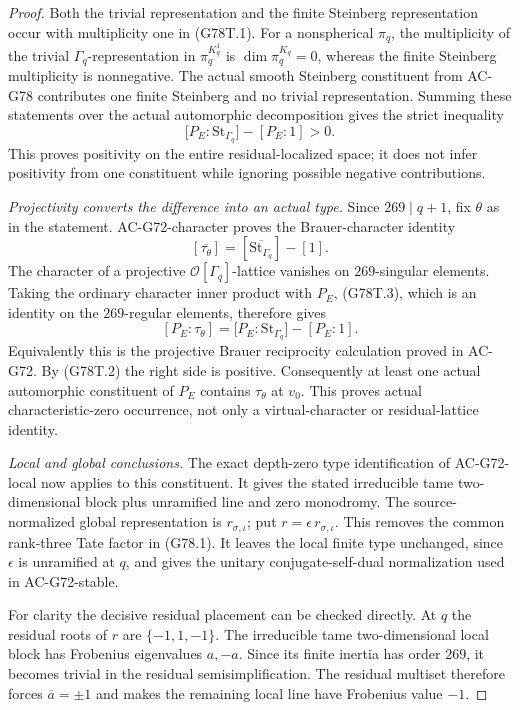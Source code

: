 \begin{proof}
Both the trivial representation and the finite Steinberg
representation occur with multiplicity one in (G78T.1).
For a nonspherical \(\pi_q\), the multiplicity of the trivial
\(\Gamma_q\)-representation in \(\pi_q^{K_q^1}\) is
\(\dim\pi_q^{K_q}=0\), whereas the finite Steinberg multiplicity
is nonnegative.
The actual smooth Steinberg constituent from AC-G78 contributes
one finite Steinberg and no trivial representation.
Summing these statements over the actual automorphic
decomposition gives the strict inequality
\[
 \bigl[P_E:\mathrm{St}_{\Gamma_q}\bigr]
                    -[P_E:1] >0.                   \tag{G78T.2}
\]
This proves positivity on the entire residual-localized space;
it does not infer positivity from one constituent while ignoring
possible negative contributions.

\emph{Projectivity converts the difference into an actual type.}
Since \(269\mid q+1\), fix \(\theta\) as in the statement.
AC-G72-character proves the Brauer-character identity
\[
             [\overline{\tau_\theta}]
                  =[\overline{\mathrm{St}_{\Gamma_q}}]-[1].
 \tag{G78T.3}
\]
The character of a projective \(\mathcal O[\Gamma_q]\)-lattice
vanishes on \(269\)-singular elements.
Taking the ordinary character inner product with \(P_E\),
(G78T.3), which is an identity on the \(269\)-regular elements,
therefore gives
\[
 [P_E:\tau_\theta]
       =\bigl[P_E:\mathrm{St}_{\Gamma_q}\bigr]-[P_E:1].
 \tag{G78T.4}
\]
Equivalently this is the projective Brauer reciprocity calculation
proved in AC-G72.
By (G78T.2) the right side is positive.
Consequently at least one actual automorphic constituent of
\(P_E\) contains \(\tau_\theta\) at \(v_0\).
This proves actual characteristic-zero occurrence, not only
a virtual-character or residual-lattice identity.

\emph{Local and global conclusions.}
The exact depth-zero type identification of AC-G72-local now
applies to this constituent.
It gives the stated irreducible tame two-dimensional block plus
unramified line and zero monodromy.
The source-normalized global representation is
\(r_{\sigma,\iota}\); put \(r=\epsilon\,r_{\sigma,\iota}\).
This removes the common rank-three Tate factor in (G78.1).
It leaves the local finite type unchanged, since \(\epsilon\)
is unramified at \(q\), and gives the unitary conjugate-self-dual
normalization used in AC-G72-stable.

For clarity the decisive residual placement can be checked
directly.  At \(q\) the residual roots of \(r\) are
\(\{-1,1,-1\}\).
The irreducible tame two-dimensional local block has Frobenius
eigenvalues \(a,-a\).
Since its finite inertia has order \(269\), it becomes trivial
in the residual semisimplification.
The residual multiset therefore forces
\(\overline a=\pm1\) and makes the remaining local line have
Frobenius value \(-1\).


\end{proof}
